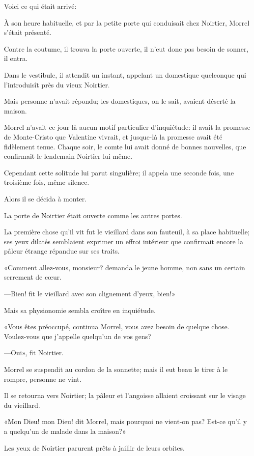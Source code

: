 Voici ce qui était arrivé: 

À son heure habituelle, et par la petite porte qui conduisait chez Noirtier, Morrel s'était présenté. 

Contre la coutume, il trouva la porte ouverte, il n'eut donc pas besoin de sonner, il entra. 

Dans le vestibule, il attendit un instant, appelant un domestique quelconque qui l'introduisît près du vieux Noirtier. 

Mais personne n'avait répondu; les domestiques, on le sait, avaient déserté la maison. 

Morrel n'avait ce jour-là aucun motif particulier d'inquiétude: il avait la promesse de Monte-Cristo que Valentine vivrait, et jusque-là la promesse avait été fidèlement tenue. Chaque soir, le comte lui avait donné de bonnes nouvelles, que confirmait le lendemain Noirtier lui-même. 

Cependant cette solitude lui parut singulière; il appela une seconde fois, une troisième fois, même silence. 

Alors il se décida à monter. 

La porte de Noirtier était ouverte comme les autres portes. 

La première chose qu'il vit fut le vieillard dans son fauteuil, à sa place habituelle; ses yeux dilatés semblaient exprimer un effroi intérieur que confirmait encore la pâleur étrange répandue sur ses traits. 

«Comment allez-vous, monsieur? demanda le jeune homme, non sans un certain serrement de cœur. 

—Bien! fit le vieillard avec son clignement d'yeux, bien!» 

Mais sa physionomie sembla croître en inquiétude. 

«Vous êtes préoccupé, continua Morrel, vous avez besoin de quelque chose. Voulez-vous que j'appelle quelqu'un de vos gens? 

—Oui», fit Noirtier. 

Morrel se suspendit au cordon de la sonnette; mais il eut beau le tirer à le rompre, personne ne vint. 

Il se retourna vers Noirtier; la pâleur et l'angoisse allaient croissant sur le visage du vieillard. 

«Mon Dieu! mon Dieu! dit Morrel, mais pourquoi ne vient-on pas? Est-ce qu'il y a quelqu'un de malade dans la maison?» 

Les yeux de Noirtier parurent prêts à jaillir de leurs orbites. 

